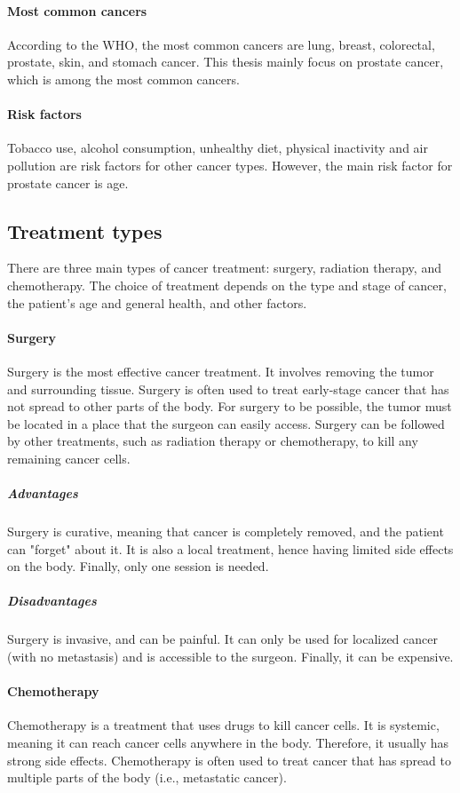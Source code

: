 \paragraph{Most common cancers}
According to the WHO, the most common cancers are lung, breast, colorectal, prostate, skin, and stomach cancer.
This thesis mainly focus on prostate cancer, which is among the most common cancers.

\paragraph{Risk factors}
Tobacco use, alcohol consumption, unhealthy diet, physical inactivity and air pollution are risk factors for other cancer types.
However, the main risk factor for prostate cancer is age.

\subsection{Treatment types}

There are three main types of cancer treatment: surgery, radiation therapy, and chemotherapy.
The choice of treatment depends on the type and stage of cancer, the patient's age and general health, and other factors.

\paragraph{Surgery}
Surgery is the most effective cancer treatment.
It involves removing the tumor and surrounding tissue.
Surgery is often used to treat early-stage cancer that has not spread to other parts of the body.
For surgery to be possible, the tumor must be located in a place that the surgeon can easily access.
Surgery can be followed by other treatments, such as radiation therapy or chemotherapy, to kill any remaining cancer cells.

\subparagraph{Advantages}
Surgery is curative, meaning that cancer is completely removed, and the patient can "forget" about it.
It is also a local treatment, hence having limited side effects on the body.
Finally, only one session is needed.

\subparagraph{Disadvantages}
Surgery is invasive, and can be painful.
It can only be used for localized cancer (with no metastasis) and is accessible to the surgeon.
Finally, it can be expensive.

\paragraph{Chemotherapy}
Chemotherapy is a treatment that uses drugs to kill cancer cells.
It is systemic, meaning it can reach cancer cells anywhere in the body.
Therefore, it usually has strong side effects.
Chemotherapy is often used to treat cancer that has spread to multiple parts of the body (i.e., metastatic cancer).

